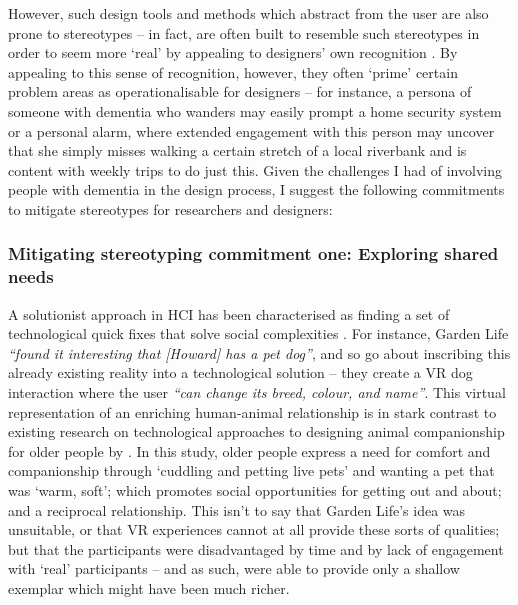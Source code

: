 However, such design tools and methods which abstract from the user are also prone to stereotypes – in fact, are often built to resemble such stereotypes in order to seem more `real' by appealing to designers’ own recognition \citep{cutting_can_2019}. By appealing to this sense of recognition, however, they often `prime' certain problem areas as operationalisable for designers – for instance, a persona of someone with dementia who wanders may easily prompt a home security system or a personal alarm, where extended engagement with this person may uncover that she simply misses walking a certain stretch of a local riverbank and is content with weekly trips to do just this. Given the challenges I had of involving people with dementia in the design process, I suggest the following commitments to mitigate stereotypes for researchers and designers:

\subsubsection{Mitigating stereotyping commitment one: Exploring shared needs }
\label{DiscussionOne:CommitOne}
A solutionist approach in HCI has been characterised as finding a set of technological quick fixes that solve social complexities \citep{cramer2014save}. For instance, Garden Life \textit{``found it interesting that [Howard] has a pet dog''}, and so go about inscribing this already existing reality into a technological solution – they create a VR dog interaction where the user \textit{``can change its breed, colour, and name''}. This virtual representation of an enriching human-animal relationship is in stark contrast to existing research on technological approaches to designing animal companionship for older people by \cite{lazar_rethinking_2016}. In this study, older people express a need for comfort and companionship through ‘cuddling and petting live pets’ and wanting a pet that was ‘warm, soft’; which promotes social opportunities for getting out and about; and a reciprocal relationship. This isn’t to say that Garden Life’s idea was unsuitable, or that VR experiences cannot at all provide these sorts of qualities; but that the participants were disadvantaged by time and by lack of engagement with `real' participants – and as such, were able to provide only a shallow exemplar which might have been much richer.

